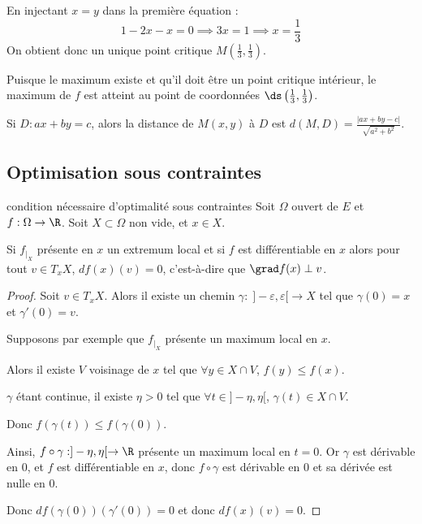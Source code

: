 \begin{exemple}
    En injectant $x=y$ dans la première équation :
    \[
    1 - 2x - x = 0 \implies 3x = 1 \implies x = \frac{1}{3}
    \]
    On obtient donc un unique point critique $M(\frac{1}{3}, \frac{1}{3})$.


    \svspace Puisque le maximum existe et qu'il doit être un point critique intérieur, le maximum de $f$ est atteint au point de coordonnées $\ds \left(\frac{1}{3}, \frac{1}{3}\right)$.
\end{exemple}


\begin{remarque}
    Si $D : ax + by = c$, alors la distance de $M(x, y)$ à $D$ est 
    $\displaystyle d(M, D) = \frac{|ax + by - c|}{\sqrt{a^2 + b^2}}$.
\end{remarque}


\subsection{Optimisation sous contraintes}


\lvspace
\avspace

\begin{propositionnt}{condition nécessaire d'optimalité sous contraintes}{}
    Soit $\Omega$ ouvert de $E$ et $f : \Omega \to \R$. Soit $X \subset \Omega$ non vide, et 
    $x \in X$. 

    Si $f_{|_X}$ présente en $x$ un extremum local et si $f$ est différentiable en $x$ alors 
    pour tout $v \in T_xX$, $df(x)(v) = 0$, c'est-à-dire que $\grad f(x) \perp v$. 
\end{propositionnt}


\begin{proof}
    Soit $v \in T_xX$. Alors il existe un chemin $\gamma : \; ]-\varepsilon, \varepsilon[ \to X$
    tel que $\gamma(0) = x$ et $\gamma'(0) = v$.

    Supposons par exemple que $f_{|_X}$ présente un maximum local en $x$.

    Alors il existe $V$ voisinage de $x$ tel que $\forall y \in X \cap V$, $f(y) \leqslant f(x)$.

    $\gamma$ étant continue, il existe $\eta > 0$ tel que $\forall t \in ]-\eta, \eta[$, $\gamma(t) \in X \cap V$.

    Donc $f(\gamma(t)) \leqslant f(\gamma(0))$.

    Ainsi, $f \circ \gamma : ]-\eta, \eta[ \to \R$ présente un maximum local en $t = 0$.
    Or $\gamma$ est dérivable en $0$, et $f$ est différentiable en $x$, donc 
    $f \circ \gamma$ est dérivable en $0$ et sa dérivée est nulle en $0$.

    Donc $df(\gamma(0))(\gamma'(0)) = 0$ et donc $df(x)(v) = 0$.
\end{proof}

